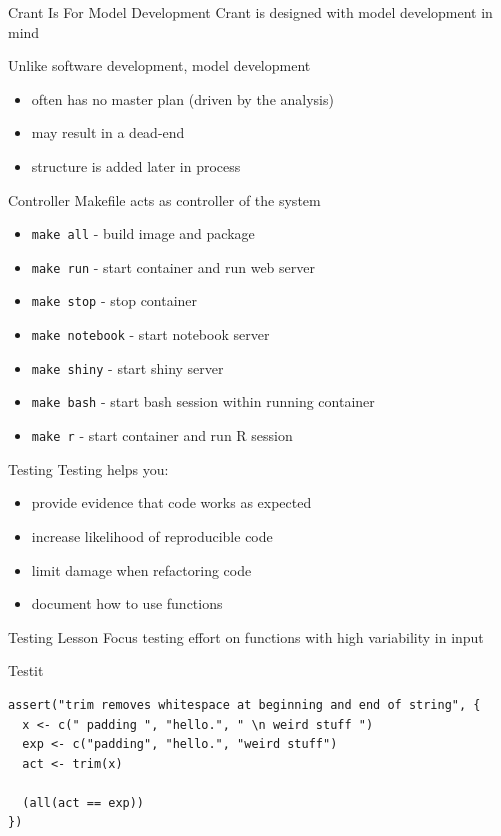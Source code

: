 \documentclass{beamer}
\begin{document}
\begin{frame}{Crant Is For Model Development}
Crant is designed with model development in mind

Unlike software development, model development
\begin{itemize}
\item often has no master plan (driven by the analysis)
\item may result in a dead-end
\item structure is added later in process
\end{itemize}
\end{frame}


\begin{frame}{Controller}
Makefile acts as controller of the system
\begin{itemize}
\item \lstinline|make all| - build image and package
\item \lstinline|make run| - start container and run web server
\item \lstinline|make stop| - stop container
\item \lstinline|make notebook| - start notebook server
\item \lstinline|make shiny| - start shiny server
\item \lstinline|make bash| - start bash session within running container
\item \lstinline|make r| - start container and run R session
\end{itemize}
\end{frame}


\begin{frame}{Testing}
Testing helps you:


\begin{itemize}
\item provide evidence that code works as expected
\item increase likelihood of reproducible code
\item limit damage when refactoring code
\item document how to use functions
\end{itemize}
\end{frame}


\begin{frame}{Testing Lesson}
\centering
\huge
\alert{Focus testing effort on functions with high variability in input}
\end{frame}


\begin{frame}[fragile]{Testit}
\begin{lstlisting}
assert("trim removes whitespace at beginning and end of string", {
  x <- c(" padding ", "hello.", " \n weird stuff ")
  exp <- c("padding", "hello.", "weird stuff")
  act <- trim(x)

  (all(act == exp))
})
\end{lstlisting}
\end{frame}
\end{document}
